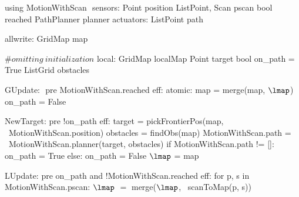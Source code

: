 using MotionWithScan $\label{moddef}$
    sensors:
        Point position
        List\<Point, Scan\> pscan
        bool reached
        PathPlanner planner
    actuators:
        List\<Point\> path

allwrite:$\label{awvar}$
    GridMap map

#$\mathit{omitting\ initialization}$
local:
   GridMap localMap
   Point target
   bool on_path = True
   List\<Grid\> obstacles

GUpdate: $\label{gup}$
  pre MotionWithScan.reached
  eff: atomic:
    map = merge(map, $\lmap$)
    on_path = False

NewTarget:$\label{newpt}$
  pre !on_path
  eff:
     target = pickFrontierPos(map, \
                         MotionWithScan.position)
     obstacles = findObs(map)
     MotionWithScan.path = \
        MotionWithScan.planner(target, obstacles)
     if MotionWithScan.path != []:
        on_path = True
     else:
        on_path = False
     $\lmap$ = map

LUpdate:$\label{lup}$
   pre on_path and !MotionWithScan.reached
   eff:
      for p, s in MotionWithScan.pscan:
         $\lmap$ $=$ merge($\lmap$, \
                             scanToMap(p, s))
